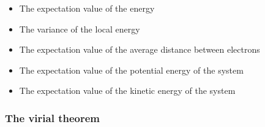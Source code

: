 \begin{itemize}
	\item The expectation value of the energy
	\item The variance of the local energy
	\item The expectation value of the average distance between electrons
	\item The expectation value of the potential energy of the system 
	\item The expectation value of the kinetic energy of the system
\end{itemize}

\subsubsection{The virial theorem }